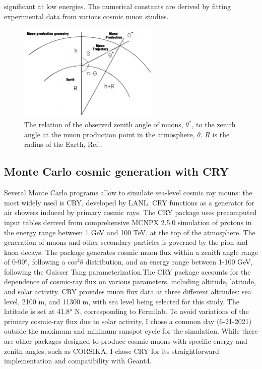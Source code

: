 significant at low energies. The numerical constants are derived by fitting experimental data from various cosmic muon studies.
\begin{figure}[!h]
    \centering
    \includegraphics[width =0.6\textwidth]{figures/png/Screenshot_20240526_140716.png}
    \caption{The relation of the observed zenith angle of muons, $\theta^*$, to the zenith angle at the muon production point in the atmosphere, $\theta$. 
    $R$ is the radius of the Earth, Ref.\cite{guan2015parametrization}.}
    \label{fig:anglesinmuon}
\end{figure}

\subsection{Monte Carlo cosmic generation with CRY}
Several Monte Carlo programs allow to simulate sea-level 
cosmic ray mouns: the most widely used is CRY, developed 
by LANL. CRY functions as a generator for air showers 
induced by primary cosmic rays. The CRY package uses 
precomputed input tables derived from comprehensive 
MCNPX 2.5.0 simulation of protons in the energy range 
between 1 GeV and 100 TeV, at the top of the atmosphere.
The generation of muons and other secondary particles 
is governed by the pion and kaon decays. The package 
generates cosmic muon flux within a zenith angle range 
of 0-90°, following a cos$^2 \theta$ distribution, and an 
energy range between 1-100 GeV, following the Gaisser 
Tang parameterization.The CRY package accounts for the 
dependence of cosmic-ray flux on various parameters, 
including altitude, latitude, and solar activity. CRY 
provides muon flux data at three different altitudes: 
sea level, 2100 m, and 11300 m, with sea level being 
selected for this study. The latitude is set at 41.8° N, 
corresponding to Fermilab. To avoid variations of the 
primary cosmic-ray flux due to solar activity, I chose 
a common day (6-21-2021) outside the maximum and minimum 
sunspot cycle for the simulation. While there are other 
packages designed to produce cosmic muons with specific 
energy and zenith angles, such as CORSIKA, I chose CRY 
for its straightforward implementation and compatibility with Geant4. 

